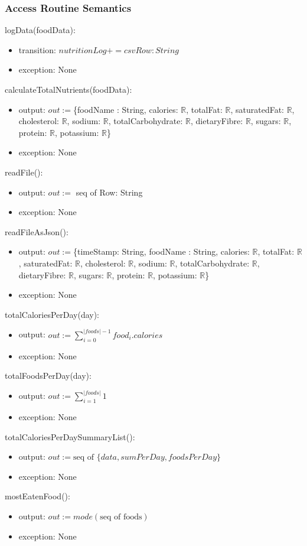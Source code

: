 \documentclass[12pt, titlepage]{article}
\begin{document}
\subsubsection{Access Routine Semantics}
\noindent logData(foodData):
\begin{itemize}
	\item transition: $nutritionLog += csvRow : String$ 
	\item exception: None
\end{itemize}
\noindent calculateTotalNutrients(foodData):
\begin{itemize}
	\item output: $out :=$\{foodName : String, calories: $\mathbb{R}$, 
	totalFat: $\mathbb{R}$, saturatedFat: $\mathbb{R}$, cholesterol: 
	$\mathbb{R}$, sodium: $\mathbb{R}$, totalCarbohydrate: $\mathbb{R}$, 
	dietaryFibre: $\mathbb{R}$, sugars: $\mathbb{R}$, protein: $\mathbb{R}$, 
	potassium: $\mathbb{R}$\} 
	\item exception: None
\end{itemize}
\noindent readFile():
\begin{itemize}
	\item output: $out :=$ seq of Row: String 
	\item exception: None
\end{itemize}
\noindent readFileAsJson():
\begin{itemize}
	\item output: $out := $\{timeStamp: String, foodName : String, calories: 
	$\mathbb{R}$, 
	totalFat: $\mathbb{R}$, saturatedFat: $\mathbb{R}$, cholesterol: 
	$\mathbb{R}$, sodium: $\mathbb{R}$, totalCarbohydrate: $\mathbb{R}$, 
	dietaryFibre: $\mathbb{R}$, sugars: $\mathbb{R}$, protein: $\mathbb{R}$, 
	potassium: $\mathbb{R}$\} 
	\item exception: None
\end{itemize}
\noindent totalCaloriesPerDay(day):
\begin{itemize}
	\item output: $out := \sum_{i=0}^{|foods|-1}food_i.calories$ 
	\item exception: None
\end{itemize}
\noindent totalFoodsPerDay(day):
\begin{itemize}
	\item output: $out := \sum_{i=1}^{|foods|} 1$ 
	\item exception: None
\end{itemize}
\noindent totalCaloriesPerDaySummaryList():
\begin{itemize}
	\item output: $out := \text{seq of $\{data, sumPerDay, foodsPerDay\}$}$ 
	\item exception: None
\end{itemize}
\noindent mostEatenFood():
\begin{itemize}
	\item output: $out := mode(\text{seq of foods})$ 
	\item exception: None
\end{itemize}
\end{document}

